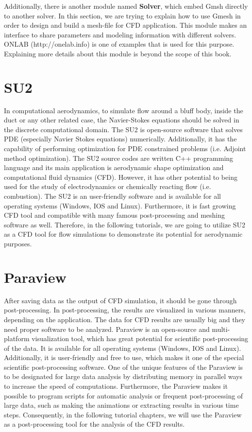 Additionally, there is another module named \textbf{Solver}, which embed Gmsh directly to another solver.
In this section, we are trying to explain how to use Gmesh in order to design and build a mesh-file for CFD application. This module makes an interface to share parameters and modeling information with different solvers. ONLAB (http://onelab.info) is one of examples that is used for this purpose. Explaining more details about this module is beyond the scope of this book.
\section{SU2}
In computational aerodynamics, to simulate flow around a bluff body, inside the duct or any other related case, the Navier-Stokes equations should be solved in the discrete computational domain. The SU2 is open-source software that solves PDE (especially Navier Stokes equations) numerically. Additionally, it has the capability of performing optimization for PDE constrained problems (i.e. Adjoint method optimization). The SU2 source codes are written C++ programming language and its main application is aerodynamic shape optimization and computational fluid dynamics (CFD). However, it has other potential to being used for the study of electrodynamics or chemically reacting flow (i.e. combustion). The SU2 is an user-friendly software and is available for all operating systems (Windows, IOS and Linux). Furthermore, it is fast growing CFD tool and compatible with many famous post-processing and meshing software as well.
Therefore, in the following tutorials, we are going to utilize SU2 as a CFD tool for flow simulations to demonstrate its potential for aerodynamic purposes.
\section{Paraview}
After saving data as the output of CFD simulation, it should be gone through post-processing. In post-processing, the results are visualized in various manners, depending on the application. The data for CFD results are usually big and they need proper software to be analyzed. Paraview is an open-source and multi-platform visualization tool, which has great potential for scientific post-processing of the data. It is available for all operating systems (Windows, IOS and Linux). Additionally, it is user-friendly and free to use, which makes it one of the special scientific post-processing software. One of the unique features of the Paraview is to be designated for large data analysis by distributing memory in parallel ways to increase the speed of computations. Furthermore, the Paraview makes it possible to program scripts for automatic analysis or frequent post-processing of large data, such as making the animations or extracting results in various time steps. Consequently, in the following tutorial chapters, we will use the Paraview as a post-processing tool for the analysis of the CFD results.
